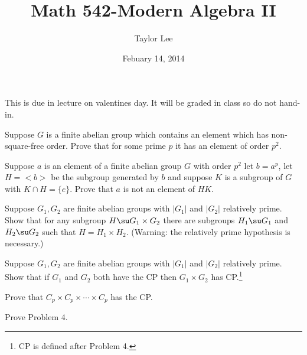 \documentclass[12pt]{article}
\theoremstyle{moo}
\begin{document}
\fontseries {\seriesdefault}
\fontshape {\shapedefault}
\selectfont

\title{ Math 542-Modern Algebra II}
\date{Febuary 14, 2014}         %
\author{Taylor Lee}      %
\maketitle                      %

\begin{disc}
This is due in lecture on valentines day.  It will be graded
in class so do not hand-in.
\begin{enum}
\item Suppose $G$ is a finite abelian group which contains an
element which has non-square-free order. Prove that for some prime
$p$ it has an element of order $p^2$.
\item Suppose $a$ is an element of a finite abelian group $G$ with
order $p^2$ let $b=a^p$, let $H=<b>$ be the subgroup generated
by $b$ and suppose $K$ is a subgroup of $G$ with $K\cap H=\{e\}$.
Prove that $a$ is not an element of $HK$.
\item Suppose $G_1,G_2$ are finite abelian groups with $|G_1|$ and
$|G_2|$ relatively prime.  Show that for any subgroup $H\su G_1\times G_2$
there are subgroups $H_1\su G_1$ and $H_2\su G_2$ such that
$H=H_1\times H_2$.   (Warning: the relatively prime hypothesis is
necessary.)
\item Suppose $G_1,G_2$ are finite abelian groups with $|G_1|$ and
$|G_2|$ relatively prime.  Show that if $G_1$ and $G_2$ both have
the CP then $G_1\times G_2$ has CP.\footnote{CP is defined after Problem 4.}
\item Prove that $C_p\times C_p\times \cdots \times C_p$ has the CP.
\item Prove Problem 4.
\end{enum}
\end{disc}
\end{document}
